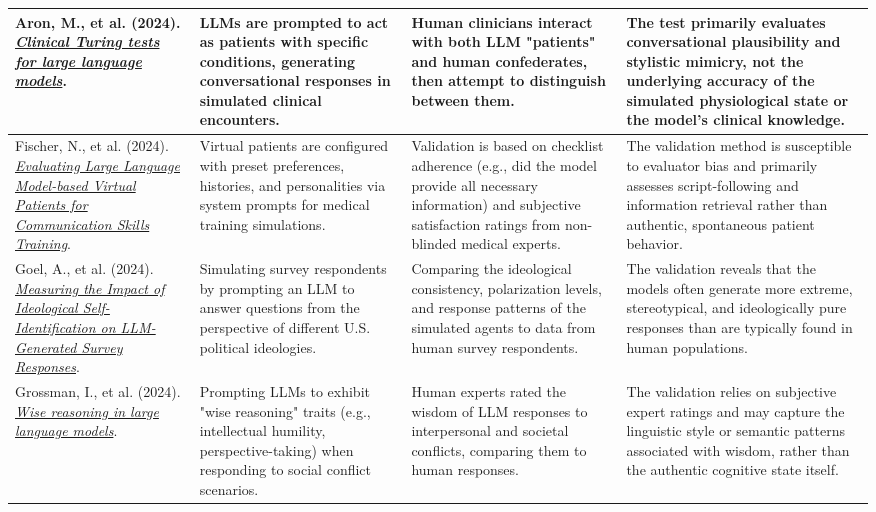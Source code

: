 {\begin{longtable}{| L{4.5cm} | L{3.5cm} | L{3.5cm} | L{3.5cm} |}
\\\hline
Aron, M., et al. (2024). \href{https://doi.org/10.1038/s41746-024-01053-1}{\textit{Clinical Turing tests for large language models}}. & LLMs are prompted to act as patients with specific conditions, generating conversational responses in simulated clinical encounters. & Human clinicians interact with both LLM "patients" and human confederates, then attempt to distinguish between them. & The test primarily evaluates conversational plausibility and stylistic mimicry, not the underlying accuracy of the simulated physiological state or the model's clinical knowledge.
\\\hline
Fischer, N., et al. (2024). \href{https://arxiv.org/abs/2405.11883}{\textit{Evaluating Large Language Model-based Virtual Patients for Communication Skills Training}}. & Virtual patients are configured with preset preferences, histories, and personalities via system prompts for medical training simulations. & Validation is based on checklist adherence (e.g., did the model provide all necessary information) and subjective satisfaction ratings from non-blinded medical experts. & The validation method is susceptible to evaluator bias and primarily assesses script-following and information retrieval rather than authentic, spontaneous patient behavior.
\\\hline
Goel, A., et al. (2024). \href{https://dl.acm.org/doi/10.1145/3613904.3642118}{\textit{Measuring the Impact of Ideological Self-Identification on LLM-Generated Survey Responses}}. & Simulating survey respondents by prompting an LLM to answer questions from the perspective of different U.S. political ideologies. & Comparing the ideological consistency, polarization levels, and response patterns of the simulated agents to data from human survey respondents. & The validation reveals that the models often generate more extreme, stereotypical, and ideologically pure responses than are typically found in human populations.
\\\hline
Grossman, I., et al. (2024). \href{https://doi.org/10.1073/pnas.2405460121}{\textit{Wise reasoning in large language models}}. & Prompting LLMs to exhibit "wise reasoning" traits (e.g., intellectual humility, perspective-taking) when responding to social conflict scenarios. & Human experts rated the wisdom of LLM responses to interpersonal and societal conflicts, comparing them to human responses. & The validation relies on subjective expert ratings and may capture the linguistic style or semantic patterns associated with wisdom, rather than the authentic cognitive state itself.

\end{longtable}}
